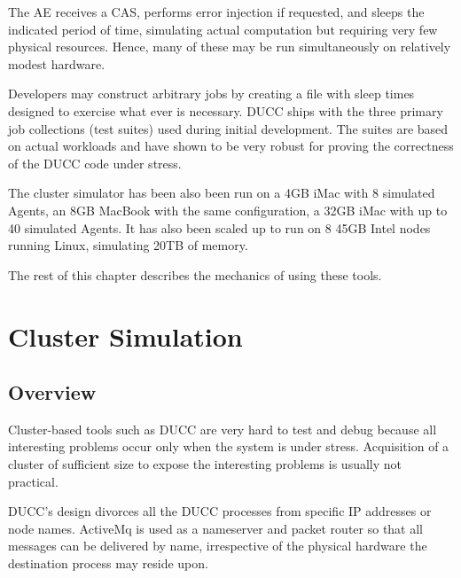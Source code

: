     The AE receives a CAS, performs error injection if requested, and
    sleeps the indicated period of time, simulating actual computation
    but requiring very few physical resources.  Hence, many of these 
    may be run simultaneously on relatively modest hardware.

    Developers may construct arbitrary jobs by creating a file with
    sleep times designed to exercise what ever is necessary.  DUCC 
    ships with the three primary job collections (test suites) used
    during initial development.  The suites are based on actual 
    workloads and have shown to be very robust for proving the correctness
    of the DUCC code under stress.

    The cluster simulator has been also been run on a 4GB iMac with 8 simulated Agents, an 8GB MacBook with
    the same configuration, a 32GB iMac with up to 40 simulated Agents. It has also been scaled
    up to run on 8 45GB Intel nodes running Linux, simulating 20TB of memory.

    The rest of this chapter describes the mechanics of using these tools.

\section{Cluster Simulation}

    \subsection{Overview}
    Cluster-based tools such as DUCC are very hard to test and debug
    because all interesting problems occur only when the system is
    under stress.  Acquisition of a cluster of sufficient size to 
    expose the interesting problems is usually not practical.

    DUCC's design divorces all the DUCC processes from specific IP
    addresses or node names.  ActiveMq is used as a nameserver and
    packet router so that all messages can be delivered by name,
    irrespective of the physical hardware the destination process
    may reside upon.  

